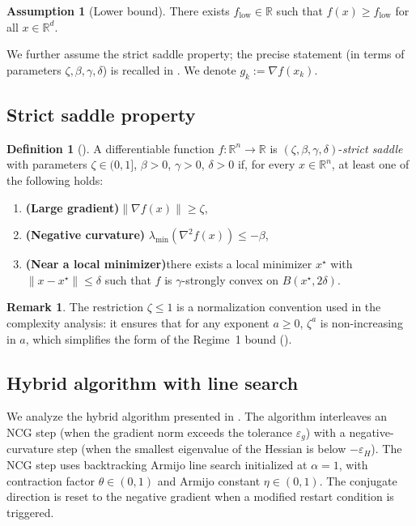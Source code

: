 \documentclass[11pt,a4paper]{article}
\theoremstyle{plain}
\theoremstyle{definition}
\newtheorem{definition}{Definition}
\newtheorem{assumption}{Assumption}
\newtheorem{remark}{Remark}
\newcommand{\R}{\mathbb{R}}
\newcommand{\eps}{\varepsilon}
\newcommand{\epsg}{\eps_{g}}
\newcommand{\epsH}{\eps_{H}}
\newcommand{\grad}{\nabla}
\newcommand{\xstar}{x^{\star}}
\newcommand{\flow}{f_{\mathrm{low}}}
\begin{document}
\begin{assumption}[Lower bound]\label{ass:lb}
There exists $\flow \in \R$ such that $f(x) \geq \flow$ for all $x \in \R^{d}$.
\end{assumption}

We further assume the strict saddle property; the precise statement (in terms of parameters $\zeta, \beta, \gamma, \delta$) is recalled in . 
We denote $g_{k} := \grad f(x_{k})$.

\subsection{Strict saddle property}\label{subsec:strict-saddle}

\begin{definition}[\cite{GeSaddle15}]
\label{def:strict_saddle}
A differentiable function $f:\mathbb{R}^n\to\mathbb{R}$ is
$(\zeta,\beta,\gamma,\delta)$-\emph{strict saddle} with parameters $\zeta \in (0, 1]$, $\beta > 0$, $\gamma > 0$, $\delta > 0$
if, for every
$x\in\mathbb{R}^n$, at least one of the following holds:
\begin{enumerate}
  \item \textbf{(Large gradient)}\quad $\|\nabla f(x)\|\geq\zeta$,
  \item \textbf{(Negative curvature)}\quad
        $\lambda_{\min}(\nabla^2 f(x))\leq-\beta$,
  \item \textbf{(Near a local minimizer)}\quad there exists a local
        minimizer $\xstar$ with $\|x - \xstar\| \leq \delta$ such that $f$ is
        $\gamma$-strongly convex on $B(\xstar, 2\delta)$.
\end{enumerate}
\end{definition}

\begin{remark}\label{rem:zeta-bound}
The restriction $\zeta \leq 1$ is a normalization convention used in the complexity analysis: it ensures that for any exponent $a \geq 0$, $\zeta^{a}$ is non-increasing in $a$,
which simplifies the form of the Regime~1 bound ().
\end{remark}

\subsection{Hybrid algorithm with line search}\label{subsec:algorithm}

We analyze the hybrid algorithm presented in . The algorithm interleaves an NCG step (when the gradient norm exceeds the tolerance $\epsg$) with a negative-curvature step (when the smallest eigenvalue of the Hessian is below $-\epsH$). The NCG step uses backtracking Armijo line search initialized at $\alpha = 1$, with contraction factor $\theta \in (0,1)$ and Armijo constant $\eta \in (0,1)$. The conjugate direction is reset to the negative gradient when a modified restart condition is triggered.
\end{document}
